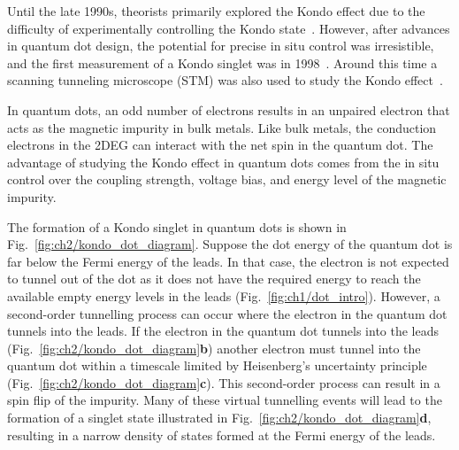 Until the late 1990s, theorists primarily explored the Kondo effect due to the difficulty of experimentally controlling the Kondo state~\cite{kondo_review}. However, after advances in quantum dot design, the potential for precise in situ control was irresistible, and the first measurement of a Kondo singlet was in 1998~\cite{goldhaber_first_kondo}. Around this time a scanning tunneling microscope (STM) was also used to study the Kondo effect~\cite{stm_kondo}.

In quantum dots, an odd number of electrons results in an unpaired electron that acts as the magnetic impurity in bulk metals. Like bulk metals, the conduction electrons in the 2DEG can interact with the net spin in the quantum dot. The advantage of studying the Kondo effect in quantum dots comes from the in situ control over the coupling strength, voltage bias, and energy level of the magnetic impurity.

The formation of a Kondo singlet in quantum dots is shown in Fig.~\ref{fig:ch2/kondo_dot_diagram}. 
Suppose the dot energy of the quantum dot is far below the Fermi energy of the leads. In that case, the electron is not expected to tunnel out of the dot as it does not have the required energy to reach the available empty energy levels in the leads (Fig.~\ref{fig:ch1/dot_intro}). However, a second-order tunnelling process can occur where the electron in the quantum dot tunnels into the leads. If the electron in the quantum dot tunnels into the leads (Fig.~\ref{fig:ch2/kondo_dot_diagram}\textbf{b}) another electron must tunnel into the quantum dot within a timescale limited by Heisenberg’s uncertainty principle (Fig.~\ref{fig:ch2/kondo_dot_diagram}\textbf{c}). This second-order process can result in a spin flip of the impurity. Many of these virtual tunnelling events will lead to the formation of a singlet state illustrated in Fig.~\ref{fig:ch2/kondo_dot_diagram}\textbf{d}, resulting in a narrow density of states formed at the Fermi energy of the leads. 



